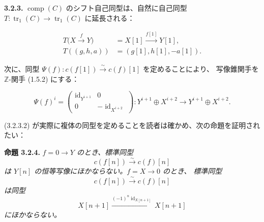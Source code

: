 \clearpage
{}%
\noindent\textbf{3.2.3.}\quad
{}
$\operatorname{comp}(C)$ のシフト自己同型は、自然に自己同型
$T\colon\operatorname{tr}_1(C)\longrightarrow\operatorname{tr}_1(C)$ に延長される：

\begin{equation}
  \begin{aligned}
    T\bigl(X\xrightarrow{f}Y\bigr)
      &=X[1]\xrightarrow{f[1]}Y[1],\\
    T((g,h,a))&=(g[1],h[1],-a[1]).
  \end{aligned}
  \tag{3.2.3.1}
\end{equation}

次に、同型
$\Psi(f)\colon c(f[1])\xrightarrow{\sim}c(f)[1]$ を定めることにより、
写像錐関手を $\mathbb Z$-関手 (1.5.2) にする：

\begin{equation}
  \Psi(f)^i=
  \begin{pmatrix}
    \operatorname{id}_{Y^{i+1}} & 0\\
    0 & -\operatorname{id}_{X^{i+2}}
  \end{pmatrix}
  \colon Y^{i+1}\oplus X^{i+2}
  \longrightarrow Y^{i+1}\oplus X^{i+2}.
  \tag{3.2.3.2}
\end{equation}

(3.2.3.2) が実際に複体の同型を定めることを読者は確かめ、次の命題を証明されたい：

\noindent\textbf{命題 3.2.4.}\quad
{}
\emph{$f=0\longrightarrow Y$ のとき、標準同型}
\begin{equation*}
  c(f[n])\xrightarrow{\sim}c(f)[n]
\end{equation*}
\emph{は $Y[n]$ の恒等写像にほかならない。$f=X\longrightarrow0$ のとき、
標準同型}
\begin{equation*}
  c(f[n])\xrightarrow{\sim}c(f)[n]
\end{equation*}
\emph{は同型}
\begin{equation*}
  X[n+1]\xrightarrow{(-1)^n\operatorname{id}_{X[n+1]}}X[n+1]
\end{equation*}
\emph{にほかならない。}

